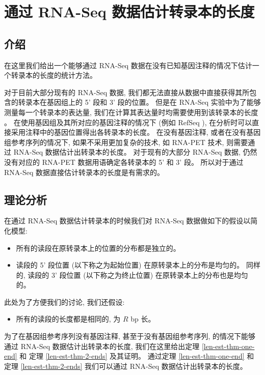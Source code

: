 \chapter{通过 RNA-Seq 数据估计转录本的长度}
\label{chap-lenest}

\section{介绍}
在这里我们给出一个能够通过 RNA-Seq 数据在没有已知基因注释的情况下估计一个转录本的长度的统计方法。 

对于目前大部分现有的 RNA-Seq 数据, 
我们都无法直接从数据中直接获得其所包含的转录本在基因组上的 5' 段和 3' 段的位置。 
但是在 RNA-Seq 实验中为了能够测量每一个转录本的表达量, 
我们在计算其表达量时均需要使用到该转录本的长度 
\cite{mortazavi2008mapping, Jiang15042009, cufflinks.2010}。 
在使用基因组及其所对应的基因注释的情况下 (例如 RefSeq \cite{_refseq}), 
在分析时可以直接采用注释中的基因位置得出各转录本的长度。 
在没有基因注释, 或者在没有基因组参考序列的情况下, 
如果不采用更加复杂的技术, 如 RNA-PET \cite{Fullwood01042009} 技术, 
则需要通过 RNA-Seq 数据估计出转录本的长度。 对于现有的大部分 RNA-Seq 数据, 
仍然没有对应的 RNA-PET 数据用语确定各转录本的 5' 和 3' 段。 
所以对于通过 RNA-Seq 数据直接估计转录本的长度是有需求的。 

\section{理论分析}
在通过 RNA-Seq 数据估计转录本的时候我们对 RNA-Seq 数据做如下的假设以简化模型: 
\begin{itemize}
\item 所有的读段在原转录本上的位置的分布都是独立的。 

\item 读段的 5' 段位置 (以下称之为起始位置) 在原转录本上的分布是均匀的。 
同样的, 读段的 3' 段位置 (以下称之为终止位置) 在原转录本上的分布也是均匀的。 
\end{itemize}
此处为了方便我们的讨论, 我们还假设: 
\begin{itemize}
\item 所有的读段的长度都是相同的, 为 $R$ bp 长。
\end{itemize}

为了在基因组参考序列没有基因注释, 甚至于没有基因组参考序列, 
的情况下能够通过 RNA-Seq 数据估计出转录本的长度, 
我们在这里给出定理 \ref{len-est-thm-one-end} 和 
定理 \ref{len-est-thm-2-ends} 及其证明。 
通过定理 \ref{len-est-thm-one-end} 和 
定理 \ref{len-est-thm-2-ends} 
我们可以通过 RNA-Seq 数据估计出转录本的长度。 

